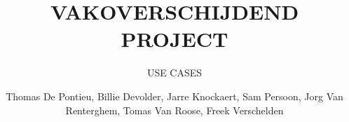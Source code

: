 \documentclass[a4paper, twoside, 12pt]{ugent_report}
\begin{document}
\title{VAKOVERSCHIJDEND PROJECT}
\subtitle{USE CASES\\}
\author{Thomas De Pontieu, Billie Devolder, Jarre Knockaert, Sam Persoon, Jorg Van Renterghem, Tomas Van Roose, Freek Verschelden}
\maketitle

\restoregeometry
\newpage\null\thispagestyle{empty}\newpage
\end{document}
